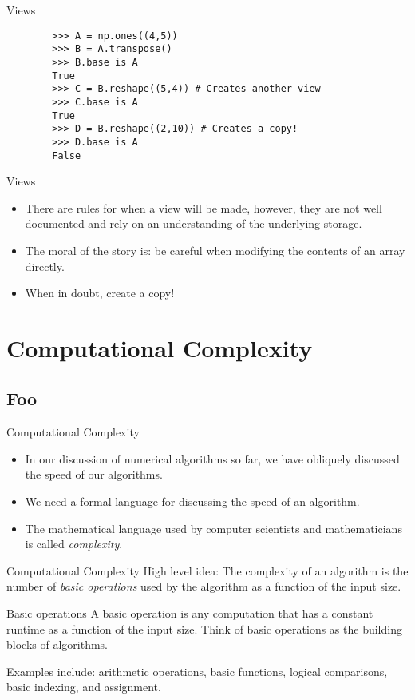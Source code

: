 \documentclass[serif,xcolor=pdftex,dvipsnames,table,hyperref={bookmarks=false,breaklinks}]{beamer}
\begin{document}
\begin{frame}[t,fragile]{Views}
	\begin{lstlisting}
		>>> A = np.ones((4,5))
		>>> B = A.transpose()
		>>> B.base is A
		True
		>>> C = B.reshape((5,4)) # Creates another view
		>>> C.base is A
		True
		>>> D = B.reshape((2,10)) # Creates a copy!
		>>> D.base is A
		False
	\end{lstlisting}
\end{frame}
	
\begin{frame}[t]{Views}
	\begin{itemize}[<+->]
		\item There are rules for when a view will be made, however, they are not well documented and rely on an understanding of the underlying storage.
		\item The moral of the story is: be careful when modifying the contents of an array directly.
		\item When in doubt, create a copy!
	\end{itemize}
\end{frame}

\section{Computational Complexity}
\subsection{Foo}

\begin{frame}[t]{Computational Complexity}
	\begin{itemize}[<+->]
		\item In our discussion of numerical algorithms so far, we have obliquely discussed the speed of our algorithms. 
		\item We need a formal language for discussing the speed of an algorithm.
		\item The mathematical language used by computer scientists and mathematicians is called \emph{complexity}.
	\end{itemize}
\end{frame}

\begin{frame}[t]{Computational Complexity}
	High level idea: The complexity of an algorithm is the number of \emph{basic operations} used by the algorithm as a function of the input size.
	
	\pause
	\begin{block}{Basic operations}
		A basic operation is any computation that has a constant runtime as a function of the input size. Think of basic operations as the building blocks of algorithms.
	\end{block}
	
	\pause
	Examples include: arithmetic operations, basic functions, logical comparisons, basic indexing, and assignment.
\end{frame}
\end{document}
